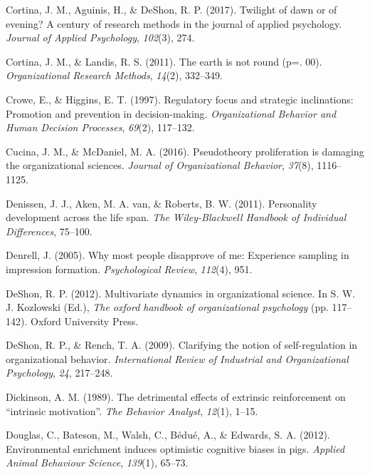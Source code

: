 \documentclass[english,,man]{apa6}
\theoremstyle{definition}
\theoremstyle{definition}
\theoremstyle{definition}
\theoremstyle{remark}
\begin{document}
\leavevmode\hypertarget{ref-Cortina2017}{}%
Cortina, J. M., Aguinis, H., \& DeShon, R. P. (2017). Twilight of dawn
or of evening? A century of research methods in the journal of applied
psychology. \emph{Journal of Applied Psychology}, \emph{102}(3), 274.

\leavevmode\hypertarget{ref-Cortina2011}{}%
Cortina, J. M., \& Landis, R. S. (2011). The earth is not round (p=.
00). \emph{Organizational Research Methods}, \emph{14}(2), 332--349.

\leavevmode\hypertarget{ref-crowe1997}{}%
Crowe, E., \& Higgins, E. T. (1997). Regulatory focus and strategic
inclinations: Promotion and prevention in decision-making.
\emph{Organizational Behavior and Human Decision Processes},
\emph{69}(2), 117--132.

\leavevmode\hypertarget{ref-Cucina2016}{}%
Cucina, J. M., \& McDaniel, M. A. (2016). Pseudotheory proliferation is
damaging the organizational sciences. \emph{Journal of Organizational
Behavior}, \emph{37}(8), 1116--1125.

\leavevmode\hypertarget{ref-denissen2011}{}%
Denissen, J. J., Aken, M. A. van, \& Roberts, B. W. (2011). Personality
development across the life span. \emph{The Wiley-Blackwell Handbook of
Individual Differences}, 75--100.

\leavevmode\hypertarget{ref-denrell2005}{}%
Denrell, J. (2005). Why most people disapprove of me: Experience
sampling in impression formation. \emph{Psychological Review},
\emph{112}(4), 951.

\leavevmode\hypertarget{ref-DeShon2012}{}%
DeShon, R. P. (2012). Multivariate dynamics in organizational science.
In S. W. J. Kozlowski (Ed.), \emph{The oxford handbook of organizational
psychology} (pp. 117--142). Oxford University Press.

\leavevmode\hypertarget{ref-deshon2009}{}%
DeShon, R. P., \& Rench, T. A. (2009). Clarifying the notion of
self-regulation in organizational behavior. \emph{International Review
of Industrial and Organizational Psychology}, \emph{24}, 217--248.

\leavevmode\hypertarget{ref-dickinson1989}{}%
Dickinson, A. M. (1989). The detrimental effects of extrinsic
reinforcement on ``intrinsic motivation''. \emph{The Behavior Analyst},
\emph{12}(1), 1--15.

\leavevmode\hypertarget{ref-douglas2012}{}%
Douglas, C., Bateson, M., Walsh, C., Bédué, A., \& Edwards, S. A.
(2012). Environmental enrichment induces optimistic cognitive biases in
pigs. \emph{Applied Animal Behaviour Science}, \emph{139}(1), 65--73.
\end{document}
